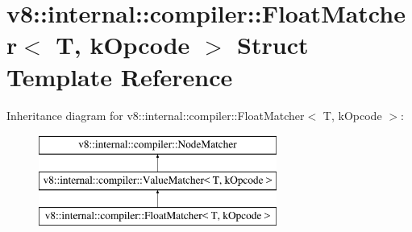 \hypertarget{structv8_1_1internal_1_1compiler_1_1FloatMatcher}{}\section{v8\+:\+:internal\+:\+:compiler\+:\+:Float\+Matcher$<$ T, k\+Opcode $>$ Struct Template Reference}
\label{structv8_1_1internal_1_1compiler_1_1FloatMatcher}
Inheritance diagram for v8\+:\+:internal\+:\+:compiler\+:\+:Float\+Matcher$<$ T, k\+Opcode $>$\+:\begin{figure}[H]
\begin{center}
\leavevmode
\includegraphics[height=3.000000cm]{structv8_1_1internal_1_1compiler_1_1FloatMatcher}
\end{center}
\end{figure}
